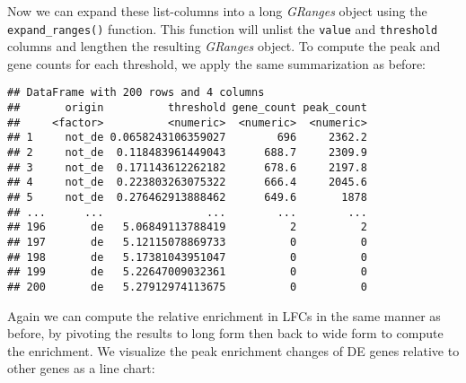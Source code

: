 \documentclass[
]{article}
\newenvironment{Shaded}{}{}
\newcommand{\DataTypeTok}[1]{\textcolor[rgb]{0.56,0.13,0.00}{#1}}
\newcommand{\DecValTok}[1]{\textcolor[rgb]{0.25,0.63,0.44}{#1}}
\newcommand{\KeywordTok}[1]{\textcolor[rgb]{0.00,0.44,0.13}{\textbf{#1}}}
\newcommand{\NormalTok}[1]{#1}
\newcommand{\OperatorTok}[1]{\textcolor[rgb]{0.40,0.40,0.40}{#1}}
\newcommand{\StringTok}[1]{\textcolor[rgb]{0.25,0.44,0.63}{#1}}
\begin{document}
Now we can expand these list-columns into a long \emph{GRanges} object using the
\texttt{expand\_ranges()} function. This function will unlist the \texttt{value} and
\texttt{threshold} columns and lengthen the resulting \emph{GRanges} object. To compute
the peak and gene counts for each threshold, we apply the same summarization as
before:

\begin{Shaded}
\end{Shaded}

\begin{verbatim}
## DataFrame with 200 rows and 4 columns
##       origin          threshold gene_count peak_count
##     <factor>          <numeric>  <numeric>  <numeric>
## 1     not_de 0.0658243106359027        696     2362.2
## 2     not_de  0.118483961449043      688.7     2309.9
## 3     not_de  0.171143612262182      678.6     2197.8
## 4     not_de  0.223803263075322      666.4     2045.6
## 5     not_de  0.276462913888462      649.6       1878
## ...      ...                ...        ...        ...
## 196       de   5.06849113788419          2          2
## 197       de   5.12115078869733          0          0
## 198       de   5.17381043951047          0          0
## 199       de   5.22647009032361          0          0
## 200       de   5.27912974113675          0          0
\end{verbatim}

Again we can compute the relative enrichment in LFCs in the same manner as
before, by pivoting the results to long form then back to wide form to compute
the enrichment. We visualize the peak enrichment changes of DE genes
relative to other genes as a line chart:
\end{document}
